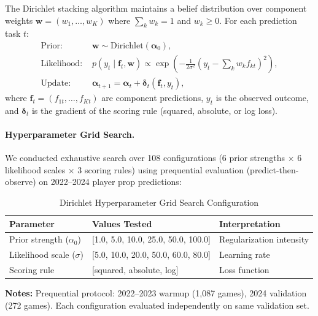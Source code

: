 The Dirichlet stacking algorithm maintains a belief distribution over component weights $\mathbf{w} = (w_1, \ldots, w_K)$ where $\sum_k w_k = 1$ and $w_k \geq 0$. For each prediction task $t$:
\begin{align}
\text{Prior: } & \mathbf{w} \sim \text{Dirichlet}(\boldsymbol{\alpha}_0), \label{eq:dirichlet-prior}\\
\text{Likelihood: } & p(y_t \mid \mathbf{f}_t, \mathbf{w}) \propto \exp\left(-\frac{1}{2\sigma^2} \left(y_t - \sum_k w_k f_{kt}\right)^2\right), \label{eq:dirichlet-likelihood}\\
\text{Update: } & \boldsymbol{\alpha}_{t+1} = \boldsymbol{\alpha}_t + \boldsymbol{\delta}_t(\mathbf{f}_t, y_t), \label{eq:dirichlet-update}
\end{align}
where $\mathbf{f}_t = (f_{1t}, \ldots, f_{Kt})$ are component predictions, $y_t$ is the observed outcome, and $\boldsymbol{\delta}_t$ is the gradient of the scoring rule (squared, absolute, or log loss).

\paragraph{Hyperparameter Grid Search.}
We conducted exhaustive search over 108 configurations (6 prior strengths × 6 likelihood scales × 3 scoring rules) using prequential evaluation (predict-then-observe) on 2022--2024 player prop predictions:

\begin{table}[htbp]
\centering
\caption{Dirichlet Hyperparameter Grid Search Configuration}
\label{tab:dirichlet-grid-config}
\small
\begin{tabular}{@{} l l l @{}}
\toprule
\textbf{Parameter} & \textbf{Values Tested} & \textbf{Interpretation} \\
\midrule
Prior strength ($\alpha_0$) & [1.0, 5.0, 10.0, 25.0, 50.0, 100.0] & Regularization intensity \\
Likelihood scale ($\sigma$) & [5.0, 10.0, 20.0, 50.0, 60.0, 80.0] & Learning rate \\
Scoring rule & [squared, absolute, log] & Loss function \\
\bottomrule
\end{tabular}
\begin{tablenotes}
\item \textbf{Notes:} Prequential protocol: 2022--2023 warmup (1,087 games), 2024 validation (272 games). Each configuration evaluated independently on same validation set.
\end{tablenotes}
\end{table}

